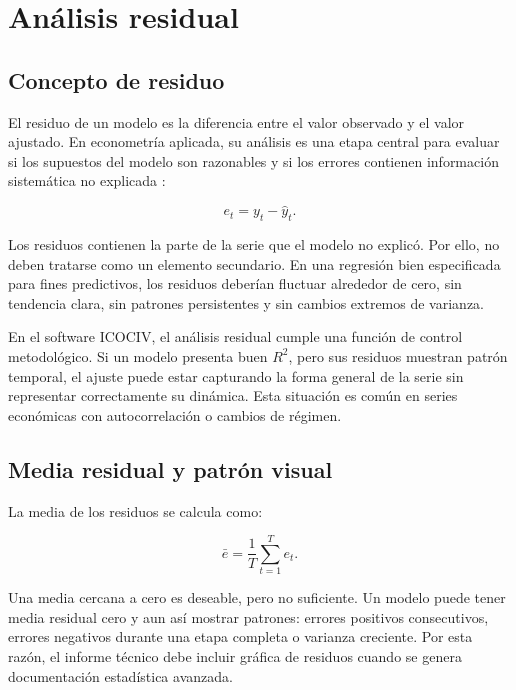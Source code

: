 \section{Análisis residual}

\subsection{Concepto de residuo}

El residuo de un modelo es la diferencia entre el valor observado y el valor ajustado. En econometría aplicada, su análisis es una etapa central para evaluar si los supuestos del modelo son razonables y si los errores contienen información sistemática no explicada \parencite{penn_state_stat501}:

\begin{equation}
    e_t = y_t - \hat{y}_t.
    \label{eq:residuo}
\end{equation}

Los residuos contienen la parte de la serie que el modelo no explicó. Por ello, no deben tratarse como un elemento secundario. En una regresión bien especificada para fines predictivos, los residuos deberían fluctuar alrededor de cero, sin tendencia clara, sin patrones persistentes y sin cambios extremos de varianza.

En el software ICOCIV, el análisis residual cumple una función de control metodológico. Si un modelo presenta buen \(R^2\), pero sus residuos muestran patrón temporal, el ajuste puede estar capturando la forma general de la serie sin representar correctamente su dinámica. Esta situación es común en series económicas con autocorrelación o cambios de régimen.

\subsection{Media residual y patrón visual}

La media de los residuos se calcula como:

\begin{equation}
    \bar{e} = \frac{1}{T}\sum_{t=1}^{T} e_t.
    \label{eq:media_residual}
\end{equation}

Una media cercana a cero es deseable, pero no suficiente. Un modelo puede tener media residual cero y aun así mostrar patrones: errores positivos consecutivos, errores negativos durante una etapa completa o varianza creciente. Por esta razón, el informe técnico debe incluir gráfica de residuos cuando se genera documentación estadística avanzada.

